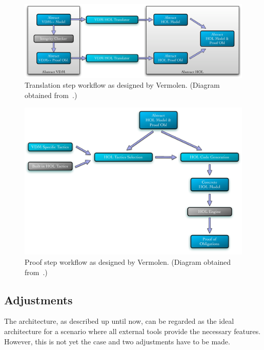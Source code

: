 \documentclass[]{article}
\begin{document}
\begin{figure}
  \begin{center}
  \includegraphics[width=.9\textwidth]{images/pic_translation.pdf}
  \caption[Translation workflow]{Translation step workflow as designed by Vermolen. (Diagram obtained from~\cite{Vermolen07}.)}
  \label{fig:arch_translation}
  \end{center}
\end{figure}

\begin{figure}
  \begin{center}
  \includegraphics[width=.9\textwidth]{images/pic_proof.pdf}
  \caption[Proof workflow]{Proof step workflow as designed by Vermolen. (Diagram obtained from~\cite{Vermolen07}.)}
  \label{fig:arch_proof}
  \end{center}
\end{figure}


\subsection{Adjustments}
\label{sub:adjustments}

The architecture, as described up until now, can be regarded as the ideal architecture for a scenario where all external tools provide the necessary features.
However, this is not yet the case and two adjustments have to be made.
\end{document}
